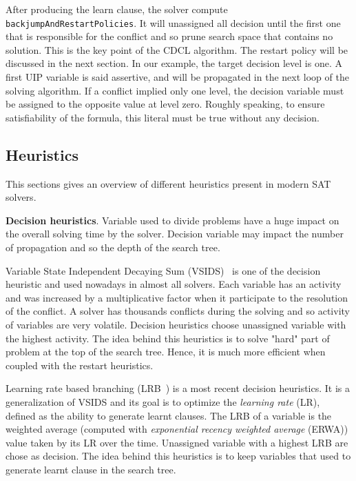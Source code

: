 After producing the learn clause, the solver compute \texttt{backjumpAndRestartPolicies}. It will unassigned all
decision until the first one that is responsible for the conflict and so prune search space that contains no solution.
This is the key point of the CDCL algorithm. The restart policy will be discussed in the next section.
In our example, the target decision level is one. A first UIP variable  is said assertive, and will be propagated in the next loop of the solving algorithm.
If a conflict implied only one level, the decision variable must 
be assigned to the opposite value at level zero. Roughly speaking, to ensure satisfiability of the formula, this 
literal must be true without any decision.

 
\subsection{Heuristics}\label{sec:heuristics}
This sections gives an overview of different heuristics present in modern SAT solvers.

\textbf{Decision heuristics}. Variable used to divide problems have a huge impact on the 
overall solving time by the solver. Decision variable may impact the number of propagation and so 
the depth of the search tree.

Variable State Independent Decaying Sum (VSIDS)~\cite{moskewicz2001chaff} is one of the decision heuristic and used
nowadays in almost all solvers. Each variable has an activity and was increased by a multiplicative factor 
when it participate to the resolution of the conflict.
A solver has thousands conflicts during the solving and so activity of variables are very volatile.
Decision heuristics choose unassigned variable with the highest activity.
The idea behind this heuristics is to solve "hard" part of problem at the top of the search tree.
Hence, it is much more efficient when coupled with the restart heuristics. 

Learning rate based branching (LRB~\cite{liang2016learning}) is a most recent decision heuristics. It is a
generalization of VSIDS and its goal is to optimize the \emph{learning rate} (LR), defined as the ability to generate
learnt clauses. The LRB of a variable is the weighted average (computed with \emph{exponential recency
weighted average} (ERWA))  value taken by its LR over the time. Unassigned variable with a highest LRB are chose as decision. The idea behind this heuristics is to keep variables that used to generate learnt clause in the search tree.


